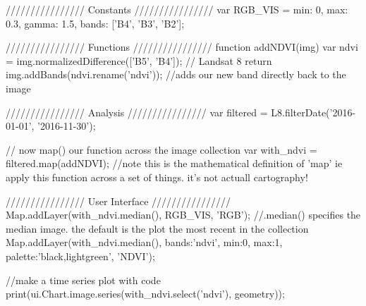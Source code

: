 //////////////// Constants ////////////////
var RGB_VIS = {min: 0, max: 0.3, gamma: 1.5, bands: ['B4', 'B3', 'B2']};




//////////////// Functions ////////////////
function addNDVI(img) {
  var ndvi = img.normalizedDifference(['B5', 'B4']); // Landsat 8
  return img.addBands(ndvi.rename('ndvi')); //adds our new band directly back to the image
}

   
//////////////// Analysis ////////////////
var filtered = L8.filterDate('2016-01-01', '2016-11-30'); 

// now map() our function across the image collection
var with_ndvi = filtered.map(addNDVI); //note this is the mathematical definition of 'map' ie apply this function across a set of things. it's not actuall cartography!


//////////////// User Interface ////////////////
Map.addLayer(with_ndvi.median(), RGB_VIS, 'RGB'); //.median() specifies the median image. the default is the plot the most recent in the collection
Map.addLayer(with_ndvi.median(), {bands:'ndvi', min:0, max:1, palette:'black,lightgreen'}, 'NDVI');

//make a time series plot with code
print(ui.Chart.image.series(with_ndvi.select('ndvi'), geometry));
